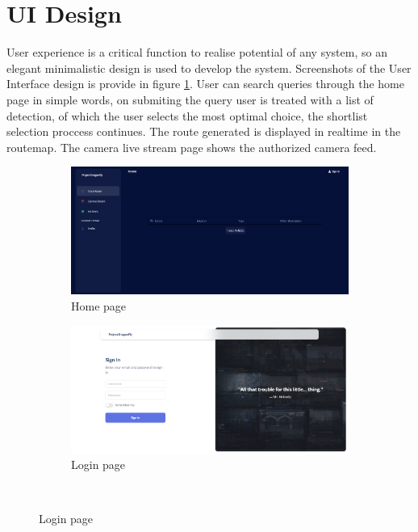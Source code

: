 \section{UI Design}
User experience is a critical function to realise potential of any system, so an elegant minimalistic design is used to develop the system. Screenshots of the User Interface design is provide in figure \ref{fig:home}.
User can search queries through the home page in simple words, on submiting the query user is treated with a list of detection, of which the user selects the most optimal choice, the shortlist selection proccess continues. The route generated is displayed in realtime in the routemap. The camera live stream page shows the authorized camera feed.
\begin{figure}[!ht]
	\centering
	\begin{subfigure}[b]{0.48\linewidth}
		\centering
		\includegraphics[width=\linewidth]{Images/UI/home}
		\caption{Home page}
		\label{fig:home}
	\end{subfigure} \hfill
	\begin{subfigure}[b]{0.48\linewidth}
		\centering
		\includegraphics[width=\linewidth]{Images/UI/login}
		\caption{Login page}
		\label{fig:login}
	\end{subfigure} \\ \vspace{3mm}

\end{figure}

